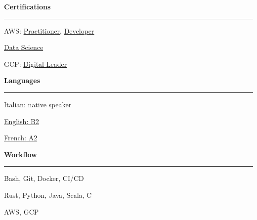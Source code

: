 \documentclass[11pt,letterpaper]{article}
\begin{document}
\begin{justify}
\begin{multicols}{3}
		\textbf{Certifications}\strut
		\hrule
		\begin{itemize}[label={}, itemsep=-5pt, leftmargin=0pt]
			\begin{item}
			      AWS:
			      \href{https://www.credly.com/badges/33614ca6-2f0d-456b-87e9-bf8b8591cbf8/public_url}{Practitioner},
			      \href{https://www.credly.com/badges/e9b6c64c-2175-4345-950b-6331fd88af43/public_url}{Developer}
			\end{item}
			\begin{item}
			      \href{https://dariocurr.github.io/assets/doc/data_science.pdf}{Data Science}
			\end{item}
			\begin{item}
			      GCP:
			      \href{https://www.credential.net/1cd9c397-58b2-4d5d-9755-7277952de891}{Digital Leader}
			\end{item}
		\end{itemize}
		\vspace*{\fill}
		\columnbreak
		\textbf{Languages}\strut
		\hrule
		\begin{itemize}[label={}, itemsep=-5pt, leftmargin=0pt]
			\begin{item}
			      Italian: native speaker
			\end{item}
			\begin{item}
			      \href{https://dariocurr.github.io/assets/doc/B2_english.pdf}{English: B2}
			\end{item}
			\begin{item}
			      \href{https://dariocurr.github.io/assets/doc/A2_french.pdf}{French: A2}
			\end{item}
		\end{itemize}
		\vspace*{\fill}
		\columnbreak
		\textbf{Workflow}\strut
		\hrule
		\begin{itemize}[label={}, itemsep=-5pt, leftmargin=0pt]
			\begin{item}
			      Bash, Git, Docker, CI/CD
			\end{item}
			\begin{item}
			      Rust, Python, Java, Scala, C
			\end{item}
			\begin{item}
			      AWS, GCP
			\end{item}
		\end{itemize}
		\vspace*{\fill}
	\end{multicols}
\end{justify}
\end{document}
